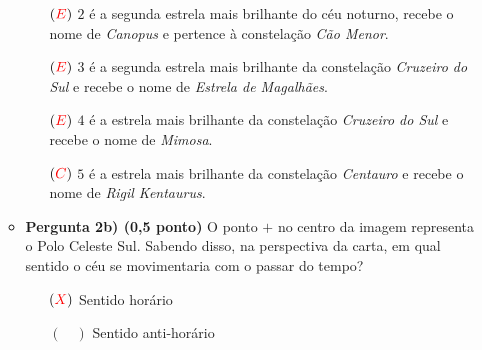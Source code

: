 \documentclass[a4paper, 12pt]{article}
\newcommand{\red}[1]{\textcolor{red}{#1}}
\begin{document}
\begin{flushleft}
\begin{itemize}
\begin{itemize}
\begin{itemize}
						\item[$(\red{E})$] $2$ é a segunda estrela mais brilhante do céu noturno, recebe o nome de \textit{Canopus} e pertence à constelação \textit{Cão Menor}.
						\item[$(\red{E})$] $3$ é a segunda estrela mais brilhante da constelação \textit{Cruzeiro do Sul} e recebe o nome de \textit{Estrela de Magalhães}.
						\item[$(\red{E})$] $4$ é a estrela mais brilhante da constelação \textit{Cruzeiro do Sul} e recebe o nome de \textit{Mimosa}.
						\item[$(\red{C})$] $5$ é a estrela mais brilhante da constelação \textit{Centauro} e recebe o nome de \textit{Rigil Kentaurus}.
					\end{itemize}
				\item \textbf{Pergunta 2b) (0,5 ponto)} O ponto $+$ no centro da imagem representa o Polo Celeste Sul. Sabendo disso, na perspectiva da carta, em qual sentido o céu se movimentaria com o passar do tempo?
					\begin{multicols}{2} \begin{itemize}
						\item[$(\red{X})$] Sentido horário
						\item[$(\quad)$] Sentido anti-horário
					\end{itemize} \end{multicols}
			\end{itemize}
		

\end{itemize}
\end{flushleft}
\end{document}
